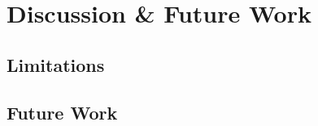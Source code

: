 \section{Discussion \& Future Work}
\label{sec:discussion}


\subsection{Limitations}

\subsection{Future Work}
